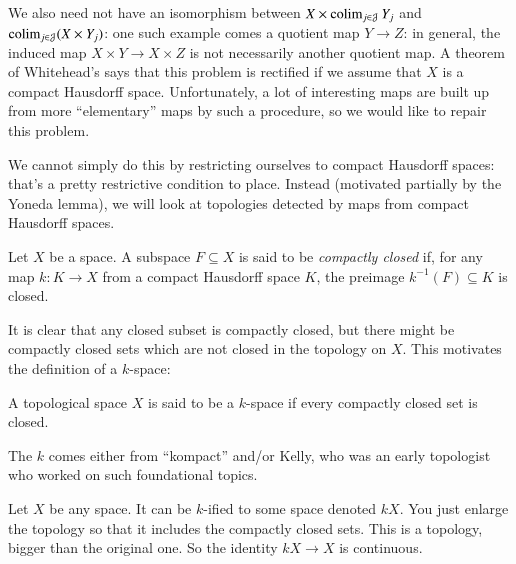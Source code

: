 We also need not have an isomorphism between
$X\times\operatorname{colim}_{j\in \mathcal J}Y_j$ and $\operatorname{colim}_{j\in \mathcal J}(X\times Y_j)$:
one such example comes a quotient map $Y\to Z$: 
in general, the induced map $X\times Y\to X\times Z$ is not necessarily another quotient map.
A theorem of Whitehead's says that this problem is rectified if we assume that $X$ is
a compact Hausdorff space.
Unfortunately, a lot of interesting maps are built up from more ``elementary'' maps by such a procedure,
so we would like to repair this problem.

We cannot simply do this by restricting ourselves to compact Hausdorff spaces:
that's a pretty restrictive condition to place.
Instead (motivated partially by the Yoneda lemma),
we will look at topologies detected by maps from compact Hausdorff spaces.
\begin{definition}
    Let $X$ be a space.
    A subspace $F\subseteq X$ is said to be \emph{compactly closed} if,
    for any map $k:K\to X$ from a compact Hausdorff space $K$, 
    the preimage $k^{-1}(F)\subseteq K$ is closed.
\end{definition}
It is clear that any closed subset is compactly closed, but
there might be compactly closed sets which are not closed in the topology on $X$.
This motivates the definition of a $k$-space:
\begin{definition}
    A topological space $X$ is said to be a $k$-space
    if every compactly closed set is closed.
\end{definition}
The $k$ comes either from ``kompact'' and/or Kelly, who was an early topologist
who worked on such foundational topics.

Let $X$ be any space. It can be $k$-ified to some space denoted $kX$. You just enlarge the topology so that it includes the compactly closed sets. This is a topology, bigger than the original one. So the identity $kX\to X$ is continuous.

